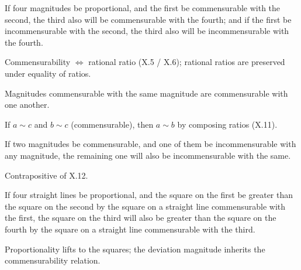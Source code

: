 \documentclass{rrxiv}
\begin{document}
\begin{claim}
\label{prop:X.11}
If four magnitudes be proportional, and the first be commensurable
with the second, the third also will be commensurable with the
fourth; and if the first be incommensurable with the second, the
third also will be incommensurable with the fourth.
\end{claim}
\begin{evidence}[Proof of X.11]
\label{ev:X.11}
Commensurability $\iff$ rational ratio (X.5 / X.6); rational ratios
are preserved under equality of ratios.
\end{evidence}

\begin{claim}
\label{prop:X.12}
Magnitudes commensurable with the same magnitude are commensurable
with one another.
\end{claim}
\begin{evidence}[Proof of X.12]
\label{ev:X.12}
If $a \sim c$ and $b \sim c$ (commensurable), then $a \sim b$ by
composing ratios (X.11).
\end{evidence}

\begin{claim}
\label{prop:X.13}
If two magnitudes be commensurable, and one of them be incommensurable
with any magnitude, the remaining one will also be incommensurable
with the same.
\end{claim}
\begin{evidence}[Proof of X.13]
\label{ev:X.13}
Contrapositive of X.12.
\end{evidence}

\begin{claim}
\label{prop:X.14}
If four straight lines be proportional, and the square on the first
be greater than the square on the second by the square on a straight
line commensurable with the first, the square on the third will also
be greater than the square on the fourth by the square on a straight
line commensurable with the third.
\end{claim}
\begin{evidence}[Proof of X.14]
\label{ev:X.14}
Proportionality lifts to the squares; the deviation magnitude
inherits the commensurability relation.
\end{evidence}
\end{document}
